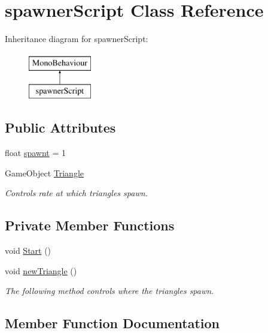 \hypertarget{classspawner_script}{}\section{spawner\+Script Class Reference}
\label{classspawner_script}
Inheritance diagram for spawner\+Script\+:\begin{figure}[H]
\begin{center}
\leavevmode
\includegraphics[height=2.000000cm]{classspawner_script}
\end{center}
\end{figure}
\subsection*{Public Attributes}
\begin{DoxyCompactItemize}
\item 
float \hyperlink{classspawner_script_a93800079e4f6fcd8728db3d0735aba79}{spawnt} = 1
\item 
Game\+Object \hyperlink{classspawner_script_ad99dc33b3262b1bb666846d952e5e0f4}{Triangle}
\begin{DoxyCompactList}\small\item\em Controls rate at which triangles spawn. \end{DoxyCompactList}\end{DoxyCompactItemize}
\subsection*{Private Member Functions}
\begin{DoxyCompactItemize}
\item 
void \hyperlink{classspawner_script_a51f0da0f6ec9342ee86ea7888d66fff8}{Start} ()
\item 
void \hyperlink{classspawner_script_a485b56d5b5d75b842e568d839aaaaa7e}{new\+Triangle} ()
\begin{DoxyCompactList}\small\item\em The following method controls where the triangles spawn. \end{DoxyCompactList}\end{DoxyCompactItemize}


\subsection{Member Function Documentation}
\hypertarget{classspawner_script_a485b56d5b5d75b842e568d839aaaaa7e}{}
